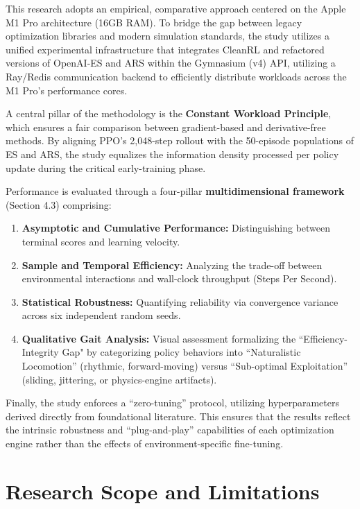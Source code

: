 This research adopts an empirical, comparative approach centered on the Apple M1 Pro architecture (16GB RAM). To bridge the gap between legacy optimization libraries and modern simulation standards, the study utilizes a unified experimental infrastructure that integrates CleanRL and refactored versions of OpenAI-ES and ARS within the Gymnasium (v4) API, utilizing a Ray/Redis communication backend to efficiently distribute workloads across the M1 Pro's performance cores.

A central pillar of the methodology is the \textbf{Constant Workload Principle}, which ensures a fair comparison between gradient-based and derivative-free methods. By aligning PPO’s 2,048-step rollout with the 50-episode populations of ES and ARS, the study equalizes the information density processed per policy update during the critical early-training phase.

Performance is evaluated through a four-pillar \textbf{multidimensional framework} (Section 4.3) comprising:
\begin{enumerate}
    \item \textbf{Asymptotic and Cumulative Performance:} Distinguishing between terminal scores and learning velocity.
    \item \textbf{Sample and Temporal Efficiency:} Analyzing the trade-off between environmental interactions and wall-clock throughput (Steps Per Second).
    \item \textbf{Statistical Robustness:} Quantifying reliability via convergence variance across six independent random seeds.
    \item \textbf{Qualitative Gait Analysis:} Visual assessment formalizing the ``Efficiency-Integrity Gap" by categorizing policy behaviors into “Naturalistic Locomotion” (rhythmic, forward-moving) versus “Sub-optimal Exploitation” (sliding, jittering, or physics-engine artifacts).
\end{enumerate}

Finally, the study enforces a ``zero-tuning'' protocol, utilizing hyperparameters derived directly from foundational literature. This ensures that the results reflect the intrinsic robustness and ``plug-and-play'' capabilities of each optimization engine rather than the effects of environment-specific fine-tuning.

\section{Research Scope and Limitations}

